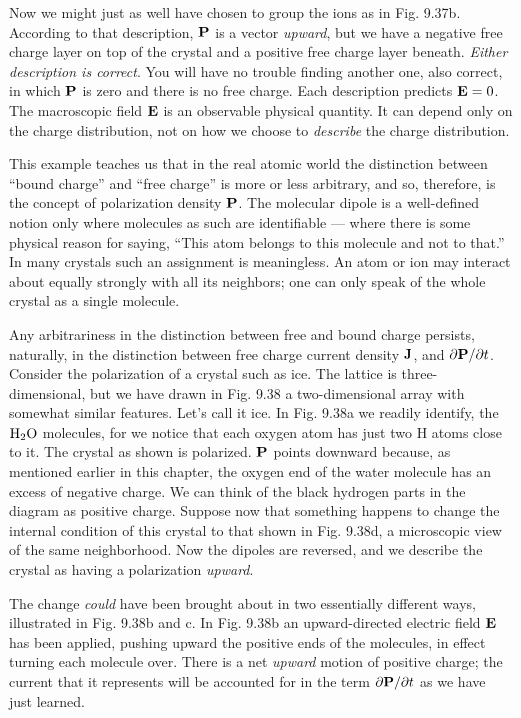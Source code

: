 Now we might just as well have chosen to group the ions as in
Fig. 9.37b. According to that description, $\mathbf{P}$ is a vector \emph{upward}, but
we have a negative free charge layer on top of the crystal and a positive
free charge layer beneath. \emph{Either description is correct}. You will
have no trouble finding another one, also correct, in which $\mathbf{P}$ is zero
and there is no free charge. Each description predicts $\mathbf{E} = 0$. The
macroscopic field $\mathbf{E}$ is an observable physical quantity. It can depend
only on the charge distribution, not on how we choose to \emph{describe}
the charge distribution.

This example teaches us that in the real atomic world the distinction
between ``bound charge'' and ``free charge'' is more or less
arbitrary, and so, therefore, is the concept of polarization density $\mathbf{P}$.
The molecular dipole is a well-defined notion only where molecules
as such are identifiable --- where there is some physical reason for
saying, ``This atom belongs to this molecule and not to that.'' In
many crystals such an assignment is meaningless. An atom or ion
may interact about equally strongly with all its neighbors; one can
only speak of the whole crystal as a single molecule.


Any arbitrariness in the distinction between free and bound charge
persists, naturally, in the distinction between free charge current
density $\mathbf{J}$, and $\partial\mathbf{P}/\partial t$.
Consider the polarization of a crystal such as
ice. The lattice is three-dimensional, but we have drawn in Fig. 9.38
a two-dimensional array with somewhat similar features. Let's call
it ice. In Fig. 9.38a we readily identify, the $\textup{H}_2\textup{O}$ molecules, for we
notice that each oxygen atom has just two H atoms close to it. The
crystal as shown is polarized. $\mathbf{P}$ points downward because, as mentioned
earlier in this chapter, the oxygen end of the water molecule
has an excess of negative charge. We can think of the black hydrogen
parts in the diagram as positive charge. Suppose now that something
happens to change the internal condition of this crystal to that
shown in Fig. 9.38d, a microscopic view of the same neighborhood.
Now the dipoles are reversed, and we describe the crystal as having
a polarization \emph{upward}.

The change \emph{could} have been brought about in two essentially different
ways, illustrated in Fig. 9.38b and c. In Fig. 9.38b an 
upward-directed electric field $\mathbf{E}$ has been applied, pushing upward the positive
ends of the molecules, in effect turning each molecule over.
There is a net \emph{upward} motion of positive charge; the current that it
represents will be accounted for in the term $\partial\mathbf{P}/\partial t$ as we have just
learned.

